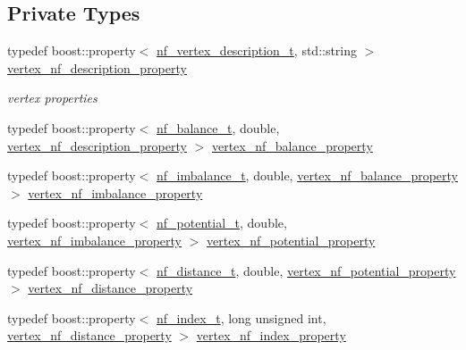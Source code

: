 \subsection*{Private Types}
\begin{DoxyCompactItemize}
\item 
typedef boost\+::property$<$ \hyperlink{structnetwork__flow_1_1nf__vertex__description__t}{nf\+\_\+vertex\+\_\+description\+\_\+t}, std\+::string $>$ \hyperlink{classnetwork__flow_afc0f1529b8715e4c4e04599e3c4dc74e}{vertex\+\_\+nf\+\_\+description\+\_\+property}
\begin{DoxyCompactList}\small\item\em vertex properties \end{DoxyCompactList}\item 
typedef boost\+::property$<$ \hyperlink{structnetwork__flow_1_1nf__balance__t}{nf\+\_\+balance\+\_\+t}, double, \hyperlink{classnetwork__flow_afc0f1529b8715e4c4e04599e3c4dc74e}{vertex\+\_\+nf\+\_\+description\+\_\+property} $>$ \hyperlink{classnetwork__flow_a909dd9bc4e908f48724ce22b849b97e8}{vertex\+\_\+nf\+\_\+balance\+\_\+property}
\item 
typedef boost\+::property$<$ \hyperlink{structnetwork__flow_1_1nf__imbalance__t}{nf\+\_\+imbalance\+\_\+t}, double, \hyperlink{classnetwork__flow_a909dd9bc4e908f48724ce22b849b97e8}{vertex\+\_\+nf\+\_\+balance\+\_\+property} $>$ \hyperlink{classnetwork__flow_a0a396ed01fb0e279605ea3be069c719f}{vertex\+\_\+nf\+\_\+imbalance\+\_\+property}
\item 
typedef boost\+::property$<$ \hyperlink{structnetwork__flow_1_1nf__potential__t}{nf\+\_\+potential\+\_\+t}, double, \hyperlink{classnetwork__flow_a0a396ed01fb0e279605ea3be069c719f}{vertex\+\_\+nf\+\_\+imbalance\+\_\+property} $>$ \hyperlink{classnetwork__flow_a7af7fd0fcbf29616fd8f9b9ffcdd896a}{vertex\+\_\+nf\+\_\+potential\+\_\+property}
\item 
typedef boost\+::property$<$ \hyperlink{structnetwork__flow_1_1nf__distance__t}{nf\+\_\+distance\+\_\+t}, double, \hyperlink{classnetwork__flow_a7af7fd0fcbf29616fd8f9b9ffcdd896a}{vertex\+\_\+nf\+\_\+potential\+\_\+property} $>$ \hyperlink{classnetwork__flow_a780d1139b4f0ab312b68f45134af86c5}{vertex\+\_\+nf\+\_\+distance\+\_\+property}
\item 
typedef boost\+::property$<$ \hyperlink{structnetwork__flow_1_1nf__index__t}{nf\+\_\+index\+\_\+t}, long unsigned int, \hyperlink{classnetwork__flow_a780d1139b4f0ab312b68f45134af86c5}{vertex\+\_\+nf\+\_\+distance\+\_\+property} $>$ \hyperlink{classnetwork__flow_a5cf2b14797e4f8b5ef2e9a83d029497c}{vertex\+\_\+nf\+\_\+index\+\_\+property}

\end{DoxyCompactItemize}
